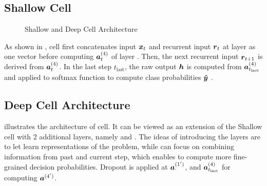 \subsection{Shallow Cell}
\begin{figure}[!htb]
\centering

     \hfill
\caption{Shallow and Deep Cell Architecture}
\end{figure}

As shown in \addfigure{\ref{fig:s2_network}},  cell first concatenates  input $\patvector{x}_t$   and recurrent input $\patvector{r}_t$   at layer  as one vector before computing $\patvector{a}_t^{(4)} $ of layer . Then,  the next recurrent input $\patvector{r}_{t+1}$ 	 is derived from $\patvector{a}_t^{(4)}$. In the last step $t_{\text{last}}$, the raw output $\patvector{h}$ is computed from $\patvector{a}^{(4)}_{t_{\text{last}}}$ and applied to softmax function to compute class probabilities $\patvector{\hat{y}}$ .



\subsection{Deep Cell Architecture}
%

\addfigure{\ref{fig:s3_network}} illustrates the architecture of   cell. It can be viewed as  an extension of the Shallow cell with  2 additional layers, namely  and .  The ideas of introducing the layers are to let  learn representations of the problem, while  can focus on combining information from past and current step, which enables  to compute more fine-grained decision probabilities. Dropout is applied at $\patvector{a}^{(1')}_{\cdot}$, and $\patvector{a}^{(4)}_{t_\text{last}}$ for computing $\patvector{a}^{(4')}$.

